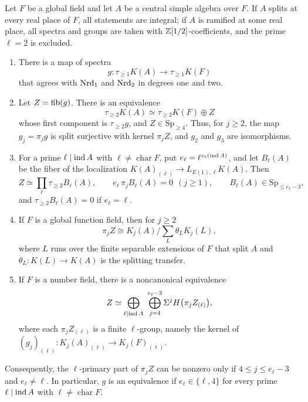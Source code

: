 \begin{introthm}\label{thm:intro-global}
Let $F$ be a global field and let $A$ be a central simple algebra over $F$.
If $A$ splits at every real place of $F$, all statements are integral; if $A$ is ramified at some real place, all spectra and groups are taken with $\mathbb Z[1/2]$-coefficients, and the prime $\ell=2$ is excluded.
\begin{enumerate}
\item There is a map of spectra
\[
 g\colon\tau_{\ge1}K(A)\longrightarrow\tau_{\ge1}K(F)
\]
that agrees with $\operatorname{Nrd}_1$ and $\operatorname{Nrd}_2$ in degrees one and two.
\item Let $Z=\operatorname{fib}(g)$.
There is an equivalence
\[
 \tau_{\ge2}K(A)\simeq\tau_{\ge2}K(F)\oplus Z
\]
whose first component is $\tau_{\ge2}g$, and $Z\in\mathrm{Sp}_{\ge4}$.
Thus, for $j\ge2$, the map $g_j=\pi_jg$ is split surjective with kernel $\pi_jZ$, and $g_2$ and $g_3$ are isomorphisms.
\item For a prime $\ell\mid\operatorname{ind} A$ with $\ell\ne\operatorname{char}F$, put $e_\ell=\ell^{v_\ell(\operatorname{ind} A)}$, and let $B_\ell(A)$ be the fiber of the localization $K(A)_{(\ell)}\to L_{E(1),\ell}K(A)$.
Then
\[
 Z\simeq\prod_{\ell}\tau_{\ge2}B_\ell(A),\qquad
 e_\ell\,\pi_jB_\ell(A)=0\ \ (j\ge1),\qquad
 B_\ell(A)\in\mathrm{Sp}_{\le e_\ell-3},
\]
and $\tau_{\ge2}B_\ell(A)=0$ if $e_\ell=\ell$.
\item
If $F$ is a global function field, then for $j\ge2$
\[
 \pi_jZ\cong K_j(A)\Big/\sum_{L}\theta_LK_j(L),
\]
where $L$ runs over the finite separable extensions of $F$ that split $A$ and $\theta_L\colon K(L)\to K(A)$ is the splitting transfer.
\item If $F$ is a number field, there is a noncanonical equivalence
\[
 Z\simeq\bigoplus_{\ell\mid\ind A}\ \bigoplus_{j=4}^{e_\ell-3}\Sigma^jH\bigl(\pi_jZ_{(\ell)}\bigr),
\]
where each $\pi_jZ_{(\ell)}$ is a finite $\ell$-group, namely the kernel of $(g_j)_{(\ell)}\colon K_j(A)_{(\ell)}\to K_j(F)_{(\ell)}$.
\end{enumerate}
\end{introthm}

Consequently, the $\ell$-primary part of $\pi_jZ$ can be nonzero only if $4\le j\le e_\ell-3$ and $e_\ell\ne\ell$.
In particular, $g$ is an equivalence if $e_\ell\in\{\ell,4\}$ for every prime $\ell\mid\operatorname{ind} A$ with $\ell\ne\operatorname{char}F$.

